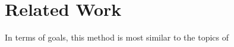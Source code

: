 \section{Related Work}
\label{sec:related_work}

In terms of goals, this method is most similar to the topics of 

% 